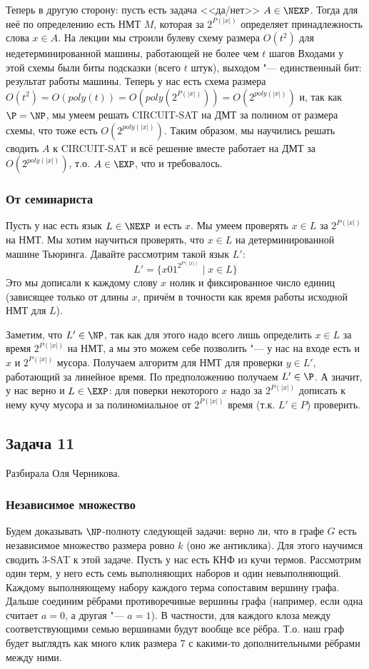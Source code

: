 		Теперь в другую сторону: пусть есть задача <<да/нет>> $A \in \NEXP$.
		Тогда для неё по определению есть НМТ $M$, которая за $2^{P(|x|)}$ определяет
		принадлежность слова $x \in A$.
		На лекции мы строили булеву схему размера $O(t^2)$ для недетерминированной машины, работающей не более чем $t$ шагов
		Входами у этой схемы были биты подсказки (всего $t$ штук), выходом "--- единственный бит: результат работы машины.
		Теперь у нас есть схема размера $O(t^2)=O(poly(t))=O(poly(2^{P(|x|)}))=O(2^{poly(|x|)})$ и,
		так как $\P=\NP$, мы умеем решать CIRCUIT-SAT на ДМТ за полином от размера схемы, что тоже есть $O(2^{poly(|x|)})$.
		Таким образом, мы научились решать сводить $A$ к CIRCUIT-SAT и всё решение вместе работает на ДМТ
		за $O(2^{poly(|x|)})$, т.о. $A \in \EXP$, что и требовалось.

	\subsubsection{От семинариста}\label{prob13_sol2}
		Пусть у нас есть язык $L \in \NEXP$ и есть $x$.
		Мы умеем проверять $x \in L$ за $2^{P(|x|)}$ на НМТ.
		Мы хотим научиться проверять, что $x\in L$ на детерминированной машине Тьюринга.
		Давайте рассмотрим такой язык $L'$:
		\[ L' = \{ x 0 1^{2^{P(|x|)}} \mid x \in L \} \]
		Это мы дописали к каждому слову $x$ нолик и фиксированное число единиц (зависящее только от длины $x$,
		причём в точности как время работы исходной НМТ для $L$).

		Заметим, что $L' \in \NP$, так как для этого надо всего лишь определить
		$x \in L$ за время $2^{P(|x|)}$ на НМТ, а мы это можем себе позволить "--- у нас на входе
		есть и $x$ и $2^{P(|x|)}$ мусора.
		Получаем алгоритм для НМТ для проверки $y \in L'$, работающий за линейное время.
		По предположению получаем $L' \in \P$.
		А значит, у нас верно и $L \in \EXP$: для поверки некоторого $x$ надо за $2^{P(|x|)}$ дописать
		к нему кучу мусора и за полиномиальное от $2^{P(|x|)}$ время (т.к. $L' \in P$) проверить.

\subsection{Задача 11}
	Разбирала Оля Черникова.

	\subsubsection{Независимое множество}
		Будем доказывать $\NP$-полноту следующей задачи: верно ли, что в графе $G$ есть независимое множество размера ровно $k$ (оно же антиклика).
		Для этого научимся сводить 3-SAT к этой задаче.
		Пусть у нас есть КНФ из кучи термов.
		Рассмотрим один терм, у него есть семь выполняющих наборов и один невыполняющий.
		Каждому выполняющему набору каждого терма сопоставим вершину графа.
		Дальше соединим рёбрами противоречивые вершины графа (например, если одна считает $a=0$, а другая "--- $a=1$).
		В частности, для каждого клоза между соответствующими семью вершинами будут вообще все рёбра.
		Т.о. наш граф будет выглядть как много клик размера 7 с какими-то дополнительными рёбрами между ними.

